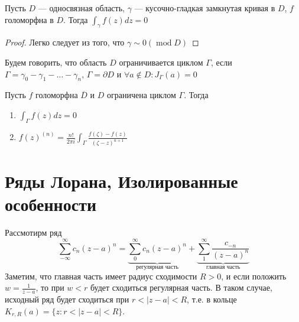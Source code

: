 \begin{theorem}
    Пусть \(D\) --- односвязная область, \(\gamma\) --- кусочно-гладкая замкнутая кривая в \(D\), \(f\) голоморфна в \(D\). Тогда \(\int_\gamma f(z)dz = 0\)
\end{theorem}
\begin{proof}
    Легко следует из того, что \(\gamma \sim 0 (\operatorname{mod} D)\)
\end{proof}

\begin{definition}
    Будем говорить, что область \(D\) ограничивается циклом \(\Gamma\), если \(\Gamma = \gamma_0 - \gamma_1 - \dots - \gamma_n\), \(\Gamma = \partial D\) и \(\forall a \notin D: J_\Gamma(a) = 0\)
\end{definition}

\begin{corollary}
    Пусть \(f\) голоморфна \(\overline{D}\) и \(D\) ограничена циклом \(\Gamma\). Тогда 
    \begin{enumerate}
        \item \(\int_\Gamma f(z)dz = 0\)
        \item \(f(z)^{(n)} = \frac{n!}{2\pi i} \int_\Gamma \frac{f(\zeta) - f(z)}{(\zeta - z)^{n + 1}}\)
    \end{enumerate}
\end{corollary}


\section{Ряды Лорана, Изолированные особенности}

Рассмотирм ряд 
\[\sum_{-\infty}^\infty c_n(z - a)^n = \underbrace{\sum_{0}^\infty c_n(z - a)^n}_{\text{регулярная часть}} + \underbrace{\sum_{1}^\infty \frac{c_{-n}}{(z - a)^n}}_{\text{главная часть}}\]
Заметим, что главная часть имеет радиус сходимости \(R > 0\), и если положить \(w = \frac{1}{z - a}\), то при \(w < r\) будет сходиться регулярная часть. В таком случае, исходный ряд будет сходиться при \(r < |z - a| < R\), т.е. в кольце \(K_{r, R}(a) = \{z: r < |z - a| < R\}\).

